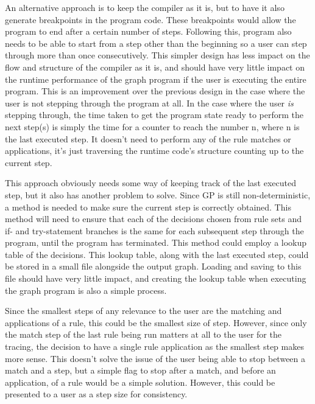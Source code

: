 \documentclass{UoYCSproject}
\begin{document}
An alternative approach is to keep the compiler as it is, but to have it also generate breakpoints in the program code. These breakpoints would allow the program to end after a certain number of steps. Following this, program also needs to be able to start from a step other than the beginning so a user can step through more than once consecutively. This simpler design has less impact on the flow and structure of the compiler as it is, and should have very little impact on the runtime performance of the graph program if the user is executing the entire program. This is an improvement over the previous design in the case where the user is not stepping through the program at all. In the case where the user \emph{is} stepping through, the time taken to get the program state ready to perform the next step(s) is simply the time for a counter to reach the number n, where n is the last executed step. It doesn't need to perform any of the rule matches or applications, it's just traversing the runtime code's structure counting up to the current step. 

This approach obviously needs some way of keeping track of the last executed step, but it also has another problem to solve. Since GP is still non-deterministic, a method is needed to make sure the current step is correctly obtained. This method will need to ensure that each of the decisions chosen from rule sets and if- and try-statement branches is the same for each subsequent step through the program, until the program has terminated. This method could employ a lookup table of the decisions. This lookup table, along with the last executed step, could be stored in a small file alongside the output graph. Loading and saving to this file should have very little impact, and creating the lookup table when executing the graph program is also a simple process.

Since the smallest steps of any relevance to the user are the matching and applications of a rule, this could be the smallest size of step. However, since only the match step of the last rule being run matters at all to the user for the tracing, the decision to have a single rule application as the smallest step makes more sense. This doesn't solve the issue of the user being able to stop between a match and a step, but a simple flag to stop after a match, and before an application, of a rule would be a simple solution. However, this could be presented to a user as a step size for consistency.
\end{document}
